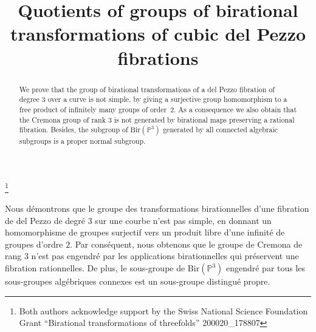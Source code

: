 \documentclass[JEP,XML,SOM,Unicode,NoFloatCountersInSection]{cedram}
\theoremstyle{plain}
\theoremstyle{definition}
\begin{document}
\frontmatter
\title[cubic del Pezzo fibrations]{Quotients of groups of birational transformations of cubic del Pezzo fibrations}

\author[\initial{J.} \lastname{Blanc}]{ }
\address{Universität Basel, Departement Mathematik und Informatik\\
Spiegelgasse 1, CH-4051 Basel, Switzerland}

\author[\initial{E.} \lastname{Yasinsky}]{ }
\address{Universität Basel, Departement Mathematik und Informatik\\
Spiegelgasse 1, CH-4051 Basel, Switzerland}

\thanks{Both authors acknowledge support by the Swiss National Science
Foundation Grant ``Birational transformations of threefolds'' 200020\_178807}





\begin{abstract}
We prove that the group of birational transformations of a del Pezzo fibration of degree $3$ over a curve is not simple, by giving a surjective group homomorphism to a free product of infinitely many groups of order~$2$. As a consequence we also obtain that the Cremona group of rank $3$ is not generated by birational maps preserving a rational fibration. Besides, the subgroup of $\mathrm{Bir}(\mathbb{P}^3)$ generated by all connected algebraic subgroups is a proper normal subgroup.
\end{abstract}

\begin{altabstract}
Nous démontrons que le groupe des transformations birationnelles d'une fibration de del Pezzo de degré $3$ sur une courbe n'est pas simple, en donnant un homomorphisme de groupes surjectif vers un produit libre d'une infinité de groupes d'ordre $2$. Par conséquent, nous obtenons que le groupe de Cremona de rang $3$ n'est pas engendré par les applications birationnelles qui préservent une fibration rationnelles. De plus, le sous-groupe de $\mathrm{Bir}(\mathbb{P}^3)$ engendré par tous les sous-groupes algébriques connexes est un sous-groupe distingué propre.
\end{altabstract}
\end{document}
